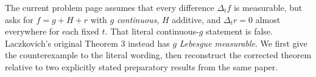 The current problem page assumes that every difference
\(\Delta_t f\) is measurable, but asks for
\(f=g+H+r\) with \(g\) \emph{continuous}, \(H\) additive,
and \(\Delta_t r=0\) almost everywhere for each fixed \(t\).
That literal continuous-\(g\) statement is false.
Laczkovich's original Theorem 3 instead has \(g\)
\emph{Lebesgue measurable}. We first give the counterexample
to the literal wording, then reconstruct the corrected
theorem relative to two explicitly stated preparatory
results from the same paper.
